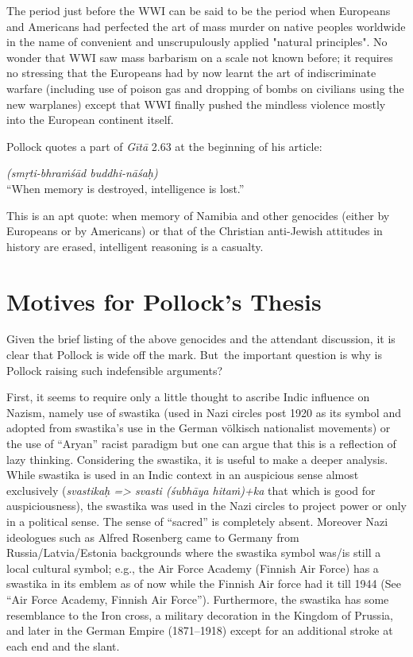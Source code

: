 The period just before the WWI can be said to be the period when Europeans and Americans had perfected the art of mass murder on native peoples worldwide in the name of convenient and unscrupulously applied "natural principles". No wonder that WWI saw mass barbarism on a scale not known before; it requires no stressing that the Europeans had by now learnt the art of indiscriminate warfare (including use of poison gas and dropping of bombs on civilians using the new warplanes) except that WWI finally pushed the mindless violence mostly into the European continent itself.

Pollock quotes a part of {\sl Gītā} 2.63 at the beginning of his article: 

\begin{myquote}
{\sl (smṛti-bhraṁśād buddhi-nāśaḥ)}\\
{\rm “When memory is destroyed, intelligence is lost.”}
\end{myquote}
This is an apt quote: when memory of Namibia and other genocides (either by Europeans or by Americans) or that of the Christian anti-Jewish attitudes in history are erased, intelligent reasoning is a casualty.

\section*{Motives for Pollock’s Thesis}
Given the brief listing of the above genocides and the attendant discussion, it is clear that Pollock is wide off the mark. But~the important question is why is Pollock raising such indefensible arguments?

First, it seems to require only a little thought to ascribe Indic influence on Nazism, namely use of swastika (used in Nazi circles post 1920 as its symbol and adopted from swastika's use in the German völkisch nationalist movements) or the use of “Aryan” racist paradigm but one can argue that this is a reflection of lazy thinking. Considering the swastika, it is useful to make a deeper analysis. While swastika is used in an Indic context in an auspicious sense almost exclusively ({\sl svastikaḥ => svasti (śubhāya hitaṁ)+ka} that which is good for auspiciousness), the swastika was used in the Nazi circles to project power or only in a political sense. The sense of “sacred” is completely absent. Moreover Nazi ideologues such as Alfred Rosenberg came to Germany from Russia/Latvia/Estonia backgrounds where the swastika symbol was/is still a local cultural symbol; e.g., the Air Force Academy (Finnish Air Force) has a swastika in its emblem as of now while the Finnish Air force had it till 1944 (See “Air Force Academy, Finnish Air Force”). Furthermore, the swastika has some resemblance to the Iron cross, a military decoration in the Kingdom of Prussia, and later in the German Empire (1871–1918) except for an additional stroke at each end and the slant.

